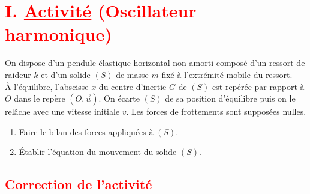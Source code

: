 \documentclass[12pt]{article}
\begin{document}
\begin{center}
\end{center}

\section*{\textcolor{red}{I. \underline{Activité} (Oscillateur harmonique)}}
On dispose d’un pendule élastique horizontal non amorti composé d’un ressort de raideur $k$ et d’un solide $(S)$ de masse $m$ fixé à l’extrémité mobile du ressort.\\
À l’équilibre, l’abscisse $x$ du centre d’inertie $G$ de $(S)$ est repérée par rapport à $O$ dans le repère $(O,\overrightarrow{u})$. On écarte $(S)$ de sa position d’équilibre puis on le relâche avec une vitesse initiale $v$. Les forces de frottements sont supposées nulles.
\begin{enumerate}
    \item Faire le bilan des forces appliquées à $(S)$.
    \item Établir l’équation du mouvement du solide $(S)$.
\end{enumerate}

\vspace{0.5cm}

\subsection*{\textcolor{red}{Correction de l'activité}}
\end{document}
